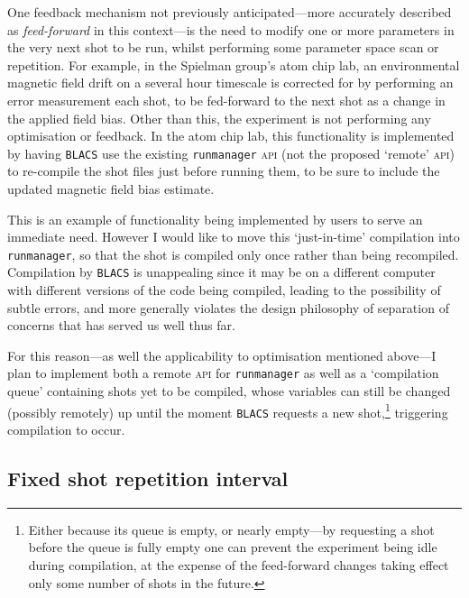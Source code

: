 One feedback mechanism not previously anticipated---more accurately described as \emph{feed-forward} in this context---is the need to modify one or more parameters in the very next shot to be run, whilst performing some parameter space scan or repetition. For example, in the Spielman group's atom chip lab, an environmental magnetic field drift on a several hour timescale is corrected for by performing an error measurement each shot, to be fed-forward to the next shot as a change in the applied field bias. Other than this, the experiment is not performing any optimisation or feedback. In the atom chip lab, this functionality is implemented by having \texttt{BLACS} use the existing \texttt{runmanager} \textsc{api} (not the proposed `remote' \textsc{api}) to re-compile the shot files just before running them, to be sure to include the updated magnetic field bias estimate. 

This is an example of functionality being implemented by users to serve an immediate need. However I would like to move this `just-in-time' compilation into \texttt{runmanager}, so that the shot is compiled only once rather than being recompiled. Compilation by \texttt{BLACS} is unappealing since it may be on a different computer with different versions of the code being compiled, leading to the possibility of subtle errors, and more generally violates the design philosophy of separation of concerns that has served us well thus far. 

For this reason---as well the applicability to optimisation mentioned above---I plan to implement both a remote \textsc{api} for \texttt{runmanager} as well as a `compilation queue' containing shots yet to be compiled, whose variables can still be changed (possibly remotely) up until the moment \texttt{BLACS} requests a new shot,\footnote{Either because its queue is empty, or nearly empty---by requesting a shot before the queue is fully empty one can prevent the experiment being idle during compilation, at the expense of the feed-forward changes taking effect only some number of shots in the future.} triggering compilation to occur.

\subsection{Fixed shot repetition interval}

